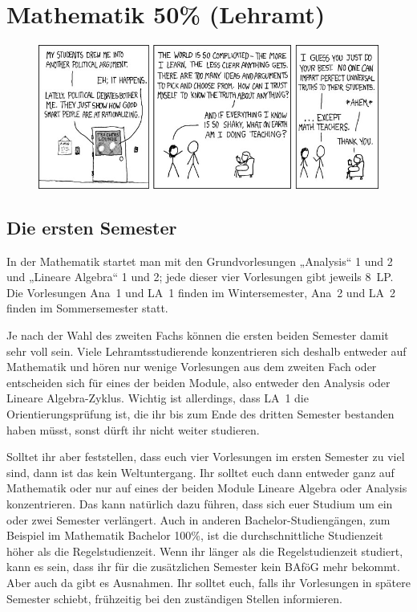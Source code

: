 \section{Mathematik 50\% (Lehramt)}

\begin{figure}[b]
\centering
\includegraphics[width=\textwidth]{bilder/certainty.jpg}
\end{figure}

\subsection{Die ersten Semester}

In der Mathematik startet man mit den Grundvorlesungen „Analysis“ 1 und 2 und „Lineare Algebra“ 1 und 2; jede dieser vier Vorlesungen gibt jeweils 8~\gls{LP}. Die Vorlesungen Ana~1 und LA~1 finden im Wintersemester, Ana~2 und LA~2 finden im Sommersemester statt. 

Je nach der Wahl des zweiten Fachs können die ersten beiden Semester damit sehr voll sein. Viele Lehramtsstudierende konzentrieren sich deshalb entweder auf Mathematik und hören nur wenige Vorlesungen aus dem zweiten Fach oder entscheiden sich für eines der beiden Module, also entweder den Analysis oder Lineare Algebra-Zyklus. Wichtig ist allerdings, dass LA~1 die Orientierungsprüfung ist, die ihr bis zum Ende des dritten Semester bestanden haben müsst, sonst dürft ihr nicht weiter studieren.

Solltet ihr aber feststellen, dass euch vier Vorlesungen im ersten Semester zu viel sind, dann ist das kein Weltuntergang. Ihr solltet euch dann entweder ganz auf Mathematik oder nur auf eines der beiden Module Lineare Algebra oder Analysis konzentrieren. Das kann natürlich dazu führen, dass sich euer Studium um ein oder zwei Semester verlängert. Auch in anderen Bachelor-Studiengängen, zum Beispiel im Mathematik Bachelor 100\%, ist die durchschnittliche Studienzeit höher als die Regelstudienzeit. Wenn ihr länger als die Regelstudienzeit studiert, kann es sein, dass ihr für die zusätzlichen Semester kein BAföG mehr bekommt. Aber auch da gibt es Ausnahmen. Ihr solltet euch, falls ihr Vorlesungen in spätere Semester schiebt, frühzeitig bei den zuständigen Stellen informieren.

